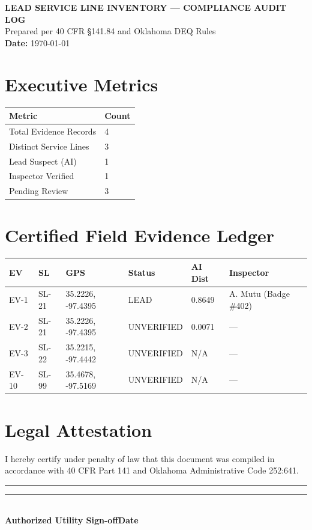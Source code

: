 \documentclass[11pt,a4paper]{article}
\begin{document}
\begin{center}
{\Large\bfseries\color{deqblue}LEAD SERVICE LINE INVENTORY --- COMPLIANCE AUDIT LOG}\\
\vspace{2mm}\small Prepared per 40 CFR \S141.84 and Oklahoma DEQ Rules\\
\textbf{Date:} \today
\end{center}
\section*{Executive Metrics}
\begin{tabular}{ll}\toprule
\textbf{Metric} & \textbf{Count}\\\midrule
Total Evidence Records & 4\\
Distinct Service Lines & 3\\
Lead Suspect (AI) & 1\\
Inspector Verified & 1\\
Pending Review & 3\\
\bottomrule\end{tabular}
\section*{Certified Field Evidence Ledger}
\begin{longtable}{llllll}
\toprule\textbf{EV} & \textbf{SL} & \textbf{GPS} & \textbf{Status} & \textbf{AI Dist} & \textbf{Inspector}\\
\midrule\endhead
EV-1 & SL-21 & 35.2226, -97.4395 & \small LEAD & 0.8649 & A. Mutu (Badge \#402) \\
\midrule
EV-2 & SL-21 & 35.2226, -97.4395 & \small UNVERIFIED & 0.0071 & --- \\
\midrule
EV-3 & SL-22 & 35.2215, -97.4442 & \small UNVERIFIED & N/A & --- \\
\midrule
EV-10 & SL-99 & 35.4678, -97.5169 & \small UNVERIFIED & N/A & --- \\
\midrule
\bottomrule\end{longtable}
\section*{Legal Attestation}
I hereby certify under penalty of law that this document was compiled in accordance with 40 CFR Part 141 and Oklahoma Administrative Code 252:641.
\vspace{1.2cm}
\noindent\rule{6cm}{0.4pt}\hfill\rule{4cm}{0.4pt}\\
\textbf{Authorized Utility Sign-off}\hfill\textbf{Date}
\end{document}
